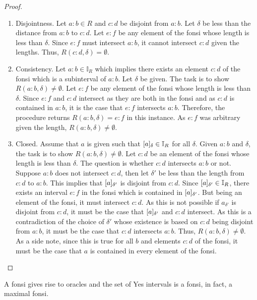 \documentclass[12pt]{article}
\begin{document}
\begin{proof}
\begin{enumerate}
        \item Disjointness. Let $a:b \in R$ and $c:d$ be disjoint from $a:b$. Let $\delta$ be less than the distance from $a:b$ to $c:d$. Let $e:f$ be any element of the fonsi whose length is less than $\delta$. Since $e:f$ must intersect $a:b$, it cannot intersect $c:d$ given the lengths. Thus, $R(c:d, \delta) = \emptyset$. 
    
        \item Consistency. Let $a:b \in \mathbb{I}_R$ which implies there exists an element $c:d$ of the fonsi which is a subinterval of $a:b$. Let  $ \delta$ be given. The task is to show $R(a:b, \delta) \neq \emptyset$. Let $e:f$ be any element of the fonsi whose length is less than $\delta$. Since $e:f$ and $c:d$ intersect as they are both in the fonsi and as $c:d$ is contained in $a:b$, it is the case that $e:f$ intersects $a:b$. Therefore, the procedure returns $R(a:b, \delta) = e:f$ in this instance. As $e:f$ was arbitrary given the length, $R(a:b, \delta) \neq \emptyset$. 
        
        \item Closed. Assume that $a$ is given such that $\halo{a} \in \mathbb{I}_R$ for all $\delta$. Given $a:b$ and $\delta$, the task is to show $R(a:b, \delta) \neq \emptyset$. Let $c:d$ be an element of the fonsi whose length is less than $\delta$. The question is whether $c:d$ intersects $a:b$ or not. Suppose $a:b$ does not intersect $c:d$, then let $\delta'$  be less than the length from $c:d$ to $a:b$. This implies that $\halo[\delta']{a}$ is disjoint from $c:d$. Since $\halo[\delta']{a} \in \mathbb{I}_R$, there exists an interval $e:f$ in the fonsi which is contained in $\halo[\delta']{a}$. But being an element of the fonsi, it must intersect $c:d$. As this is not possible if $a_{\delta'}$ is disjoint from $c:d$, it must be the case that $\halo[\delta']{a}$ and $c:d$ intersect. As this is a contradiction of the choice of $\delta'$ whose existence is based on $c:d$ being disjoint from $a:b$, it must be the case that $c:d$ intersects $a:b$. Thus, $R(a:b, \delta) \neq \emptyset$. As a side note, since this is true for all $b$ and elements $c:d$ of the fonsi, it must be the case that $a$ is contained in every element of the fonsi. 
    \end{enumerate}

\end{proof}

A fonsi gives rise to oracles and the set of Yes intervals is a fonsi, in fact, a maximal fonsi. 
\end{document}
